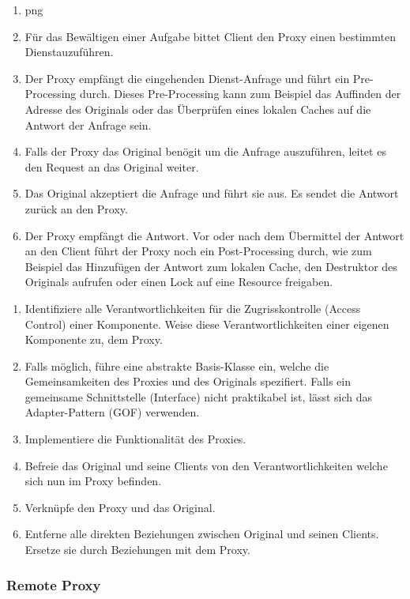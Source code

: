 \begin{enumerate}
	\item png
	\item Für das Bewältigen einer Aufgabe bittet Client den Proxy einen bestimmten Dienstauzuführen.
	\item Der Proxy empfängt die eingehenden Dienst-Anfrage und führt ein Pre-Processing durch. Dieses Pre-Processing kann zum Beispiel das Auffinden der Adresse des Originals oder das Überprüfen eines lokalen Caches auf die Antwort der Anfrage sein.
	\item Falls der Proxy das Original benögit um die Anfrage auszuführen, leitet es den Request an das Original weiter.
	\item Das Original akzeptiert die Anfrage und führt sie aus. Es sendet die Antwort zurück an den Proxy.
	\item Der Proxy empfängt die Antwort. Vor oder nach dem Übermittel der Antwort an den Client führt der Proxy noch ein Post-Processing durch, wie zum Beispiel das Hinzufügen der Antwort zum lokalen Cache, den Destruktor des Originals aufrufen oder einen Lock auf eine Resource freigaben.
\end{enumerate}


\begin{enumerate}
	\item Identifiziere alle Verantwortlichkeiten für die Zugrisskontrolle (Access Control) einer Komponente. Weise diese Verantwortlichkeiten einer eigenen Komponente zu, dem Proxy.
	\item Falls möglich, führe eine abstrakte Basis-Klasse ein, welche die Gemeinsamkeiten des Proxies und des Originals spezifiert. Falls ein gemeinsame Schnittstelle (Interface) nicht praktikabel ist, lässt sich das Adapter-Pattern (GOF) verwenden.
	\item Implementiere die Funktionalität des Proxies.
	\item Befreie das Original und seine Clients von den Verantwortlichkeiten welche sich nun im Proxy befinden.
	\item Verknüpfe den Proxy und das Original.
	\item Entferne alle direkten Beziehungen zwischen Original und seinen Clients. Ersetze sie durch Beziehungen mit dem Proxy.
\end{enumerate}


\subsubsection*{Remote Proxy}



